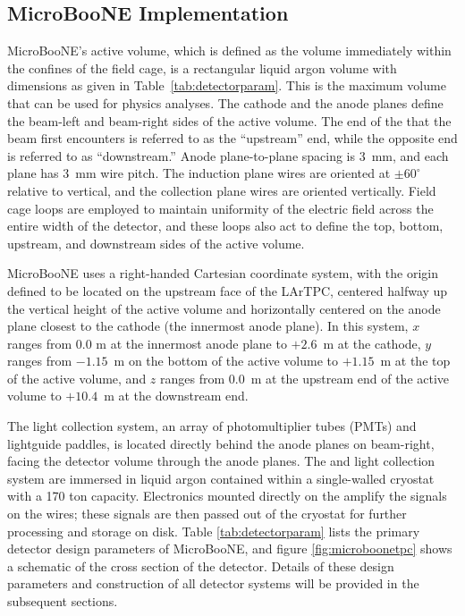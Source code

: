  


\subsection{MicroBooNE \lartpc Implementation}

MicroBooNE's \lartpc active volume, which is defined as the volume immediately within the confines of the \lartpc field cage, is a rectangular liquid argon volume with dimensions as given in Table~\ref{tab:detectorparam}. This is the maximum volume that can be used for physics analyses.  The cathode and the anode planes define the beam-left and beam-right sides of the active volume.  The end of the \lartpc that the beam first encounters is referred to as the ``upstream'' end, while the opposite end is referred to as ``downstream.''  Anode plane-to-plane spacing is 3~mm, and each plane has 3~mm wire pitch. The induction plane wires are oriented at $\pm60^{\circ}$ relative to vertical, and the collection plane wires are oriented vertically. Field cage loops are employed to maintain uniformity of the electric field across the entire width of the detector, and these loops also act to define the top, bottom, upstream, and downstream sides of the active volume.  

MicroBooNE uses a right-handed Cartesian coordinate system, with the origin defined to be located on the upstream face of the LArTPC, centered halfway up the vertical height of the active volume and horizontally centered on the anode plane closest to the cathode (the innermost anode plane).  In this system, $x$ ranges from 0.0 m at the innermost anode plane to $+2.6$~m at the cathode, $y$ ranges from $-1.15$~m on the bottom of the active volume to $+1.15$~m at the top of the active volume, and $z$ ranges from 0.0~m at the upstream end of the active volume to $+10.4$~m at the downstream end.  

The light collection system, an array of photomultiplier tubes (PMTs) and lightguide paddles, is located directly behind the anode planes on beam-right, facing the detector volume through the anode planes.  The \lartpc and light collection system are immersed in liquid argon contained within a single-walled cryostat with a 170 ton capacity.  Electronics mounted directly on the \lartpc amplify the signals on the wires; these signals are then passed out of the cryostat for further processing and storage on disk.  Table \ref{tab:detectorparam} lists the primary detector design parameters of MicroBooNE, and figure \ref{fig:microboonetpc} shows a schematic of the cross section of the detector. Details of these design parameters and construction of all detector systems will be provided in the subsequent sections.

